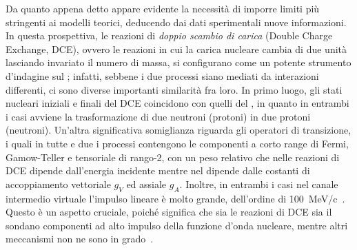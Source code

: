 Da quanto appena detto appare evidente la necessità di imporre limiti più stringenti ai modelli teorici, deducendo dai dati sperimentali nuove informazioni. 
In questa prospettiva, le reazioni di \emph{doppio scambio di carica} (Double Charge Exchange, DCE), ovvero le reazioni in cui la carica nucleare cambia di due unità lasciando invariato il numero di massa, si configurano come un potente strumento d'indagine sul \doppiobeta; 
infatti, sebbene i due processi siano mediati da interazioni differenti, ci sono diverse importanti similarità fra loro.
In primo luogo, gli stati nucleari iniziali e finali del DCE coincidono con quelli del \doppiobeta{}, in quanto in entrambi i casi avviene la trasformazione di due neutroni (protoni) in due protoni (neutroni). 
Un'altra significativa somiglianza riguarda gli operatori di transizione, i quali in tutte e due i processi contengono le componenti a corto range di Fermi, Gamow-Teller e tensoriale di rango-2, con un peso relativo che nelle reazioni di DCE dipende dall'energia incidente mentre nel \doppiobeta{} dipende dalle costanti di accoppiamento vettoriale $g_V$ ed assiale $g_A$. 
Inoltre, in entrambi i casi nel canale intermedio virtuale l'impulso lineare è molto grande, dell'ordine di 100~MeV/c~\cite{barea:prl12}. Questo è un aspetto cruciale, poiché significa che sia le reazioni di DCE sia il \doppiobeta{} sondano componenti ad alto impulso della funzione d'onda nucleare, mentre altri meccanismi non ne sono in grado~\cite{puppe:prc11}.

